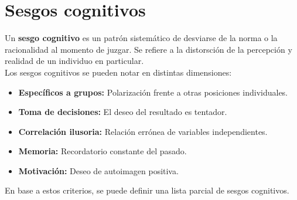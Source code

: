 \section*{Sesgos cognitivos}

Un \textbf{sesgo cognitivo} es un patrón sistemático de
desviarse de la norma o la racionalidad al momento de
juzgar. Se refiere a la distorsción de la percepción y
realidad de un individuo en particular. \\

Los sesgos cognitivos se pueden notar en distintas
dimensiones:

\begin{itemize}
\item{\textbf{Específicos a grupos:} Polarización frente
        a otras posiciones individuales.}
  \item{\textbf{Toma de decisiones:} El deseo del resultado
        es tentador.}
  \item{\textbf{Correlación ilusoria:} Relación errónea de
        variables independientes.}
  \item{\textbf{Memoria:} Recordatorio constante del pasado.}
  \item{\textbf{Motivación: }Deseo de autoimagen positiva.}
\end{itemize}

En base a estos criterios, se puede definir una lista parcial
de sesgos cognitivos.

